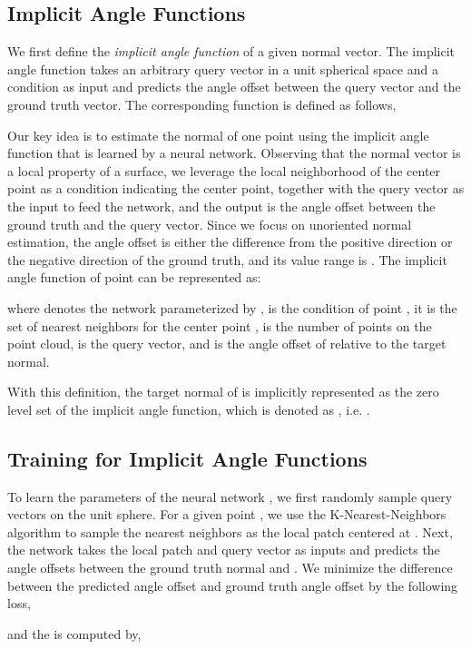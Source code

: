 \documentclass[letterpaper]{article} \usepackage{aaai23}  \usepackage{times}  \usepackage{helvet}  \usepackage{courier}  \usepackage[hyphens]{url}  \usepackage{graphicx} \urlstyle{rm} \def\UrlFont{\rm}  \usepackage{natbib}  \usepackage{caption} \frenchspacing  \setlength{\pdfpagewidth}{8.5in} \setlength{\pdfpageheight}{11in} \usepackage{algorithm}
\begin{document}
\subsection{Implicit Angle Functions}
We first define the \emph{implicit angle function} of a given normal vector. The implicit angle function takes an arbitrary query vector in a unit spherical space and a condition  as input and predicts the angle offset between the query vector and the ground truth vector. The corresponding function is defined as follows,


Our key idea is to estimate the normal of one point using the implicit angle function that is learned by a neural network. Observing that the normal vector is a local property of a surface, we leverage the local neighborhood of the center point as a condition  indicating the center point, together with the query vector as the input to feed the network, and the output is the angle offset between the ground truth and the query vector. Since we focus on unoriented normal estimation, the angle offset is either the difference from the positive direction or the negative direction of the ground truth, and its value range is . The implicit angle function of point  can be represented as:

where  denotes the network parameterized by ,   is the condition of point , it is the set of  nearest neighbors for the center point ,  is the number of points on the point cloud,  is the query vector, and  is the angle offset of  relative to the target normal. 

With this definition, the target normal of  is implicitly represented as the zero level set of the implicit angle function, which is denoted as , i.e.  . 


\subsection{Training for Implicit Angle Functions}
To learn the parameters  of the neural network , we first randomly sample query vectors  on the unit sphere. For a given point , we use the K-Nearest-Neighbors algorithm to sample the nearest neighbors  as the local patch centered at . Next, the network takes the local patch  and query vector  as inputs and predicts the angle offsets between the ground truth normal  and . We minimize the difference between the predicted angle offset  and ground truth angle offset  by the following  loss,

and the  is computed by,
\end{document}
